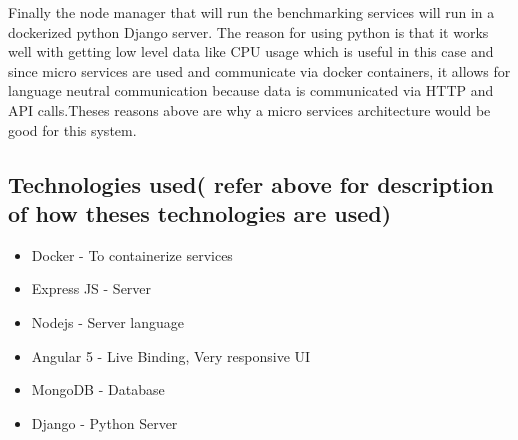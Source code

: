 Finally the node manager that will run the benchmarking services will run in a dockerized python Django server. The reason for using python is that it works well with getting low level data like CPU usage which is useful in this case and since micro services are used and communicate via docker containers, it allows for language neutral communication because data is communicated via HTTP and API calls.Theses reasons above are why a micro services architecture would be good for this system.

\subsection{Technologies used( refer above for description of how theses technologies are used)}
\begin{itemize}
    \item Docker        - To containerize services
    \item Express JS    - Server
    \item Nodejs        - Server language
    \item Angular 5     - Live Binding, Very responsive UI
    \item MongoDB       - Database
    \item Django        - Python Server
\end{itemize}